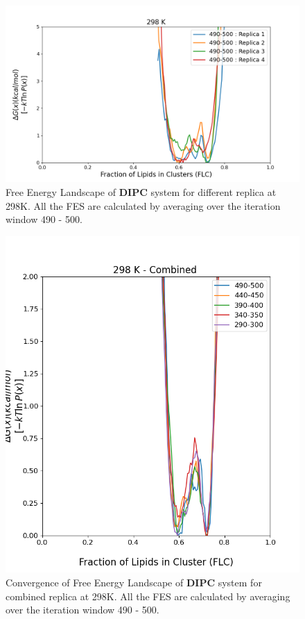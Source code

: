 \documentclass{biophys-new}
\begin{document}



\begin{figure}[hbt!]
\centering
\includegraphics[width=1.1\linewidth]{all_plots/ClusterLipids2Total/DPPC_DIPC_CHOL/298K/Average_DIPC_298_ClusterLipids2Total.png}
\caption{Free Energy Landscape of \textbf{DIPC} system for different replica at 298K. All the FES are calculated by averaging over the iteration window 490 - 500.}
\label{fig:view}

\end{figure}

\begin{figure}[hbt!]
\centering
\includegraphics[width=0.6\linewidth]{all_plots/ClusterLipids2Total/DPPC_DIPC_CHOL/298K/Convergence_DIPC_MULTI__298_ClusterLipids2Total.png}
\caption{Convergence of Free Energy Landscape of \textbf{DIPC} system for combined replica at 298K. All the FES are calculated by averaging over the iteration window 490 - 500.}
\label{fig:view}

\end{figure}
\end{document}
